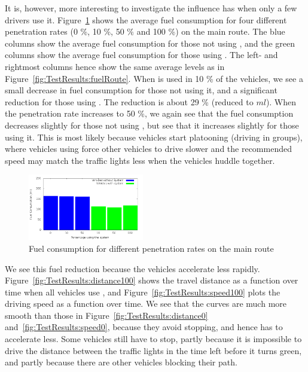 It is, however, more interesting to investigate the influence \tech has when only a few drivers use it.
Figure~\ref{fig:TestResults:combinedFuel} shows the average fuel consumption for four different penetration rates (0 \%, 10 \%, 50 \% and 100 \%) on the main route.
The blue columns show the average fuel consumption for those not using \tech, and the green columns show the average fuel consumption for those using \tech.
The left- and rightmost columns hence show the same average levels as in Figure~\ref{fig:TestResults:fuelRoute}.
When \tech is used in 10 \% of the vehicles, we see a small decrease in fuel consumption for those not using it, and a significant reduction for those using \tech.
The reduction is about 29 \% (reduced to $ml$).
When the penetration rate increases to 50 \%, we again see that the fuel consumption decreases slightly for those not using \tech, but see that it increases slightly for those using it.
This is most likely because vehicles start platooning (driving in groups), where vehicles using \tech force other vehicles to drive slower and the recommended speed may match the traffic lights less when the vehicles huddle together.

\begin{figure}[htb]
\includegraphics[width=0.45\textwidth]{../images/tp0c1_0/combinedFuel.png}
\caption{Fuel consumption for different penetration rates on the main route}
\label{fig:TestResults:combinedFuel}
\end{figure}

We see this fuel reduction because the vehicles accelerate less rapidly. 
Figure~\ref{fig:TestResults:distance100} shows the travel distance as a function over time when all vehicles use \tech, and Figure~\ref{fig:TestResults:speed100} plots the driving speed as a function over time.
We see that the curves are much more smooth than those in Figure~\ref{fig:TestResults:distance0} and~\ref{fig:TestResults:speed0}, because they avoid stopping, and hence has to accelerate less.
Some vehicles still have to stop, partly because it is impossible to drive the distance between the traffic lights in the time left before it turns green, and partly because there are other vehicles blocking their path.

